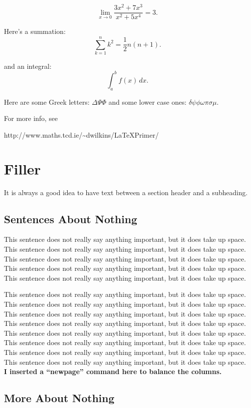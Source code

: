 \documentclass[final]{ieee}
\begin{document}
\[ \lim_{x \to 0} \frac{3x^2 +7x^3}{x^2 +5x^4} = 3.\]

Here's a summation:
\[ \sum_{k=1}^n k^2 = \frac{1}{2} n (n+1).\]

and an integral:
\[ \int_a^b f(x)\,dx.\]

Here are some Greek letters:
$ \Delta \Psi \Phi $
and some lower case ones:
$ \delta \psi \phi \omega \pi \sigma \mu $.

For more info, see


http://www.maths.tcd.ie/\~{}dwilkins/LaTeXPrimer/

\section{Filler}

It is always a good idea to have text between a section header and
a subheading.

\subsection{Sentences About Nothing}

This sentence does not really say anything important, but it does take up space.
This sentence does not really say anything important, but it does take up space.
This sentence does not really say anything important, but it does take up space.
This sentence does not really say anything important, but it does take up space.
This sentence does not really say anything important, but it does take up space.

This sentence does not really say anything important, but it does take up space.
This sentence does not really say anything important, but it does take up space.
This sentence does not really say anything important, but it does take up space.
This sentence does not really say anything important, but it does take up space.
This sentence does not really say anything important, but it does take up space.
This sentence does not really say anything important, but it does take up space.
This sentence does not really say anything important, but it does take up space.
This sentence does not really say anything important, but it does take up space.
{\bf I inserted a ``newpage'' command here to balance the columns.}

\newpage

\subsection{More About Nothing}
\end{document}
